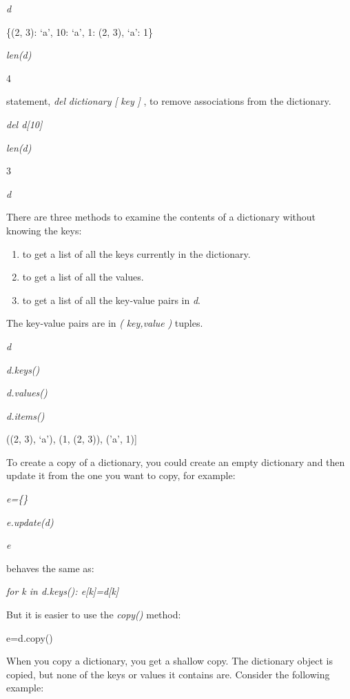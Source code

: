\emph{d}

\{(2, 3): `a', 10: `a', 1: (2, 3),
`a': 1\}


\emph{len(d)}

4


statement, \emph{del} \emph{dictionary} \emph{{[}} \emph{key} \emph{{]}}
, to remove associations from the dictionary.


\emph{del d{[}10{]}}


\emph{len(d)}

3


\emph{d}



There are three methods to examine
the contents of a dictionary without knowing the keys:

\begin{enumerate}

\item
   to get a
  list of all the keys currently in the dictionary.
\item
   to get a
  list of all the values.
\item
   to get a
  list of all the key-value pairs in \emph{d}.
\end{enumerate}

The key-value pairs are in
\emph{(} \emph{key,value} \emph{)} tuples.


\emph{d}




\emph{d.keys()}




\emph{d.values()}




\emph{d.items()}

((2, 3), `a'), (1, (2, 3)),
('a', 1){]}

To create a copy of a dictionary,
you could create an empty dictionary and then update it from the one you
want to copy, for example:


\emph{e=\{\}}


\emph{e.update(d)}


\emph{e}




behaves the same as:


\emph{for k in d.keys(): e{[}k{]}=d{[}k{]}}

But it is easier to use the
\emph{copy()} method:

e=d.copy()

When you copy a dictionary, you
get a shallow copy. The dictionary object is copied, but none of the
keys or values it contains are. Consider the following example:


